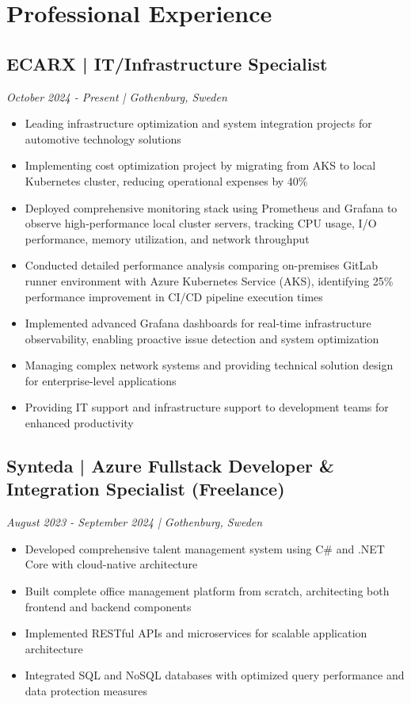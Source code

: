 \documentclass[11pt,a4paper]{article}
\begin{document}
\section*{Professional Experience}

\subsection*{ECARX | IT/Infrastructure Specialist}
\textit{October 2024 - Present | Gothenburg, Sweden}
\begin{itemize}[noitemsep]
\item Leading infrastructure optimization and system integration projects for automotive technology solutions
\item Implementing cost optimization project by migrating from AKS to local Kubernetes cluster, reducing operational expenses by 40\%
\item Deployed comprehensive monitoring stack using Prometheus and Grafana to observe high-performance local cluster servers, tracking CPU usage, I/O performance, memory utilization, and network throughput
\item Conducted detailed performance analysis comparing on-premises GitLab runner environment with Azure Kubernetes Service (AKS), identifying 25\% performance improvement in CI/CD pipeline execution times
\item Implemented advanced Grafana dashboards for real-time infrastructure observability, enabling proactive issue detection and system optimization
\item Managing complex network systems and providing technical solution design for enterprise-level applications
\item Providing IT support and infrastructure support to development teams for enhanced productivity
\end{itemize}

\subsection*{Synteda | Azure Fullstack Developer \& Integration Specialist (Freelance)}
\textit{August 2023 - September 2024 | Gothenburg, Sweden}
\begin{itemize}[noitemsep]
\item Developed comprehensive talent management system using C\# and .NET Core with cloud-native architecture
\item Built complete office management platform from scratch, architecting both frontend and backend components
\item Implemented RESTful APIs and microservices for scalable application architecture
\item Integrated SQL and NoSQL databases with optimized query performance and data protection measures
\end{itemize}
\end{document}
